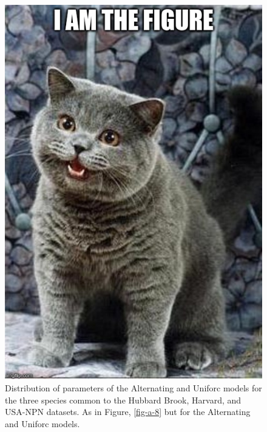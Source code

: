 \begin{figure}
	\centering
	\includegraphics[scale=0.5]{images/figure_filler.jpg}
	\caption[Distribution of parameters of the Alternating and Uniforc models for the three species common to the Hubbard Brook, Harvard, and USA-NPN datasets]{Distribution of parameters of the Alternating and Uniforc models for the three species common to the Hubbard Brook, Harvard, and USA-NPN datasets. As in Figure,  \ref{fig-a-8} but for the Alternating and Uniforc models. } \label{fig-a-9}
\end{figure}

\newpage

